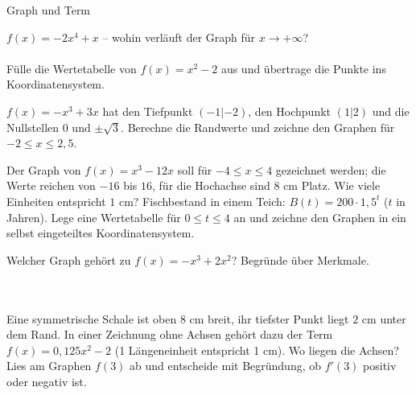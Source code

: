 \setcounter{aufgabe}{20}

\begin{aufgabe}{Graph und Term}
\begin{teile}
\teil $f(x) = -2x^4 + x$ – wohin verläuft der Graph für $x \to +\infty$? \\  \\ 
\teil Fülle die Wertetabelle von $f(x) = x^2 - 2$ aus und übertrage die Punkte ins Koordinatensystem.

\begin{ksys}[xmin=-3,xmax=3,ymin=-3,ymax=3]\end{ksys}
\teil $f(x) = -x^3 + 3x$ hat den Tiefpunkt $(-1 | -2)$, den Hochpunkt $(1 | 2)$ und die Nullstellen $0$ und $\pm\sqrt{3}$. Berechne die Randwerte und zeichne den Graphen für $-2 \le x \le 2{,}5$.

\begin{ksys}[xmin=-3,xmax=3,ymin=-9,ymax=3]\end{ksys}
\teil Der Graph von $f(x) = x^3 - 12x$ soll für $-4 \le x \le 4$ gezeichnet werden; die Werte reichen von $-16$ bis $16$, für die Hochachse sind $8$ cm Platz. Wie viele Einheiten entspricht $1$ cm?
\teil Fischbestand in einem Teich: $B(t) = 200 \cdot 1{,}5^t$ ($t$ in Jahren). Lege eine Wertetabelle für $0 \le t \le 4$ an und zeichne den Graphen in ein selbst eingeteiltes Koordinatensystem.

\teil Welcher Graph gehört zu $f(x) = -x^3 + 2x^2$? Begründe über Merkmale. \\  \\  \\ 

\begin{ksys}[xmin=-2,xmax=3,ymin=-3,ymax=3]\end{ksys}
\teil Eine symmetrische Schale ist oben $8$ cm breit, ihr tiefster Punkt liegt $2$ cm unter dem Rand. In einer Zeichnung ohne Achsen gehört dazu der Term $f(x) = 0{,}125x^2 - 2$ (1 Längeneinheit entspricht 1 cm). Wo liegen die Achsen?
\teil Lies am Graphen $f(3)$ ab und entscheide mit Begründung, ob $f'(3)$ positiv oder negativ ist.


\end{teile}
\end{aufgabe}
